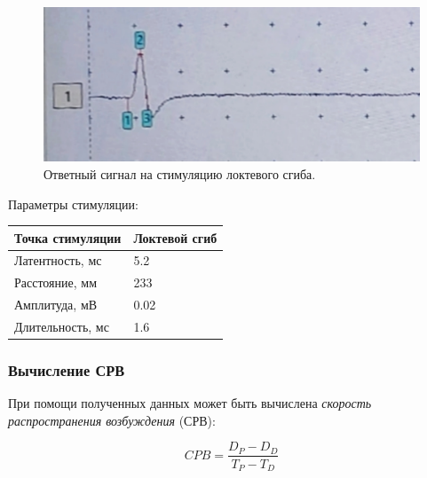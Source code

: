 \documentclass{article}
\begin{document}
            \begin{figure}[h]
                \centering
                \includegraphics[width=\textwidth]{data/3.jpg}
                \caption{Ответный сигнал на стимуляцию локтевого сгиба.}
            \end{figure}

            \begin{center}
                Параметры стимуляции:    
            \end{center}

            \begin{center}
                \begin{tabular}{|l|l|}
                    \hline
                    Точка стимуляции & Локтевой сгиб \\ \hline
                    Латентность, мс & 5.2 \\ \hline
                    Расстояние, мм & 233 \\ \hline
                    Амплитуда, мВ & 0.02 \\ \hline
                    Длительность, мс & 1.6  \\ \hline
                \end{tabular}
            \end{center}
            
                \subsubsection*{Вычисление СРВ}

                    \hspace*{4mm} При помощи полученных данных может быть вычислена \textit{скорость распространения возбуждения} (СРВ):

                    \begin{equation}
                        CPB = \frac{D_{P} - D_{D}}{T_{P} - T_{D}}
                    \end{equation}
\end{document}
